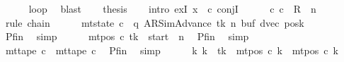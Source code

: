 \begin{isabellebody}
\ \ \ \ \isamarkupfalse%
\ loop\ \isamarkupfalse%
\ blast\isanewline
\ \ \isamarkupfalse%
\ {\isacharquery}{\kern0pt}thesis\isanewline
\ \ \isamarkupfalse%
\ {\isacharparenleft}{\kern0pt}intro\ exI{\isacharbrackleft}{\kern0pt}\ x\ {\isacharequal}{\kern0pt}\ c{\isacharprime}{\kern0pt}{\isacharbrackright}{\kern0pt}\ conjI{\isacharparenright}{\kern0pt}\isanewline
\ \ \ \ \isamarkupfalse%
\ {\isachardoublequoteopen}{\isacharparenleft}{\kern0pt}c{}{\isacharcomma}{\kern0pt}\ c{\isacharprime}{\kern0pt}{\isacharparenright}{\kern0pt}\ {\isasymin}\ R{\isacharprime}{\kern0pt}\ {\isacharcircum}{\kern0pt}{\isacharcircum}{\kern0pt}\ n{\isachardoublequoteclose}\ \isamarkupfalse%
\ {\isacharparenleft}{\kern0pt}rule\ chain{\isacharparenright}{\kern0pt}\isanewline
\ \ \ \ \isamarkupfalse%
\ {\isachardoublequoteopen}mt{\isacharunderscore}{\kern0pt}state\ c{\isacharprime}{\kern0pt}\ {\isacharequal}{\kern0pt}\ {\isacharparenleft}{\kern0pt}q{\isacharcomma}{\kern0pt}\ AR{\isacharunderscore}{\kern0pt}SimAdvance{\isacharcomma}{\kern0pt}\ tk{\isacharcomma}{\kern0pt}\ n{\isacharcomma}{\kern0pt}\ buf{\isacharcomma}{\kern0pt}\ dvec{\isacharcomma}{\kern0pt}\ posk{\isacharparenright}{\kern0pt}{\isachardoublequoteclose}\isanewline
\ \ \ \ \ \ \isamarkupfalse%
\ Pfin\ \isamarkupfalse%
\ simp\isanewline
\ \ \ \ \isamarkupfalse%
\ {\isachardoublequoteopen}mt{\isacharunderscore}{\kern0pt}pos\ c{\isacharprime}{\kern0pt}\ tk\ {\isacharequal}{\kern0pt}\ {\isacharquery}{\kern0pt}start\ {\isacharminus}{\kern0pt}\ n{\isachardoublequoteclose}\ \isamarkupfalse%
\ Pfin\ \isamarkupfalse%
\ simp\isanewline
\ \ \ \ \isamarkupfalse%
\ {\isachardoublequoteopen}mt{\isacharunderscore}{\kern0pt}tape\ c{\isacharprime}{\kern0pt}\ {\isacharequal}{\kern0pt}\ mt{\isacharunderscore}{\kern0pt}tape\ c{}{\isachardoublequoteclose}\ \isamarkupfalse%
\ Pfin\ \isamarkupfalse%
\ simp\isanewline
\ \ \ \ \isamarkupfalse%
\ {\isachardoublequoteopen}{\isasymforall}k{\isacharprime}{\kern0pt}{\isachardot}{\kern0pt}\ k{\isacharprime}{\kern0pt}\ {\isasymnoteq}\ tk\ {\isasymlongrightarrow}\ mt{\isacharunderscore}{\kern0pt}pos\ c{\isacharprime}{\kern0pt}\ k{\isacharprime}{\kern0pt}\ {\isacharequal}{\kern0pt}\ mt{\isacharunderscore}{\kern0pt}pos\ c{}\ k{\isacharprime}{\kern0pt}{\isachardoublequoteclose}\ \isamarkupfalse%

\end{isabellebody}
